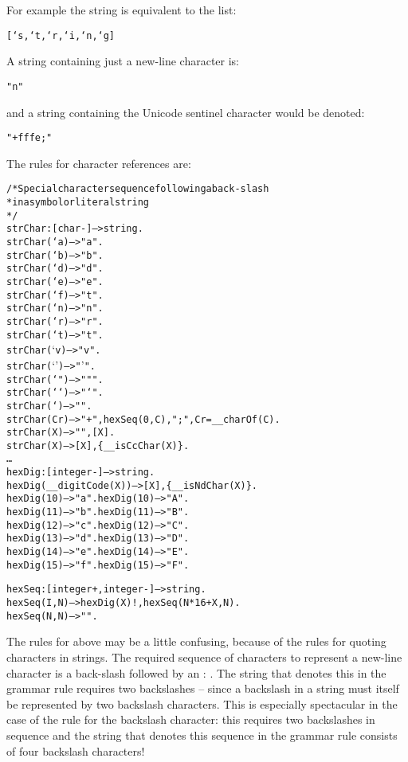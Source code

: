 For example the string  is equivalent to the list:
\begin{alltt}
[`s,`t,`r,`i,`n,`g]
\end{alltt}
A string containing just a new-line character is:
\begin{alltt}
"\bsl{}n"
\end{alltt}
and a string containing the Unicode sentinel character would be denoted:
\begin{alltt}
"\bsl{}+fffe;"
\end{alltt}

The rules for character references are:
\begin{alltt}
/* Special character sequence following a back-slash
*  in a symbol or literal string
*/
strChar:[char-]-->string.
strChar(`\bsl{}a) --> "\bsl{}\bsl{}a".
strChar(`\bsl{}b) --> "\bsl{}\bsl{}b".
strChar(`\bsl{}d) --> "\bsl{}\bsl{}d".
strChar(`\bsl{}e) --> "\bsl{}\bsl{}e".
strChar(`\bsl{}f) --> "\bsl{}\bsl{}t".
strChar(`\bsl{}n) --> "\bsl{}\bsl{}n".
strChar(`\bsl{}r) --> "\bsl{}\bsl{}r".
strChar(`\bsl{}t) --> "\bsl{}\bsl{}t".
strChar(`\bsl{}v) --> "\bsl{}\bsl{}v".
strChar(`\bsl{}') --> "\bsl{}\bsl{}'".
strChar(`\bsl{}") --> "\bsl{}\bsl{}"".
strChar(`\bsl{}`) --> "\bsl{}\bsl{}`".
strChar(`\bsl{}\bsl{}) --> "\bsl{}\bsl{}\bsl{}\bsl{}".
strChar(Cr) --> "\bsl{}\bsl{}+",hexSeq(0,C),";",Cr=__charOf(C).
strChar(X) --> "\bsl{}\bsl{}", [X].
strChar(X) --> [X],\{\nasf{}\_\_isCcChar(X)\}.
\dots
hexDig:[integer-]-->string.
hexDig(__digitCode(X)) --> [X],\{\_\_isNdChar(X)\}.
hexDig(10) --> "a".  hexDig(10) --> "A".
hexDig(11) --> "b".  hexDig(11) --> "B".
hexDig(12) --> "c".  hexDig(12) --> "C".
hexDig(13) --> "d".  hexDig(13) --> "D".
hexDig(14) --> "e".  hexDig(14) --> "E".
hexDig(15) --> "f".  hexDig(15) --> "F".

hexSeq:[integer+,integer-]-->string.
hexSeq(I,N) --> hexDig(X)!,hexSeq(N*16+X,N).
hexSeq(N,N) --> "".
\end{alltt}
\begin{aside}
The rules for  above may be a little confusing, because of the rules for quoting characters in strings. The required sequence of characters to represent a new-line character is a back-slash followed by an : . The string that denotes this in the grammar rule requires two backslashes -- since a backslash in a string must itself be represented by two backslash characters. This is especially spectacular in the case of the  rule for the backslash character: this requires two backslashes in sequence and the string that denotes this sequence in the grammar rule consists of four backslash characters!
\end{aside}

